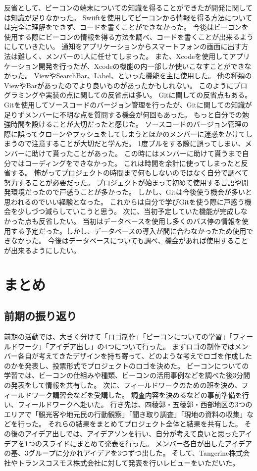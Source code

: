 \documentclass[openany,11pt,papersize]{jsbook}
\begin{document}
反省として、ビーコンの端末についての知識を得ることができたが開発に関しては知識が足りなかった。
Swiiftを使用してビーコンから情報を得る方法については完全に理解をできず、コードを書くことができなかった。
今後はビーコンを使用する際にビーコンの情報を得る方法を調べ、コードを書くことが出来るようにしていきたい。
通知をアプリケーションからスマートフォンの画面に出す方法は難しく、メンバーの1人に任せてしまった。
また、Xcodeを使用してアプリケーション開発を行ったが、Xcodeの機能の内一部しか使いこなすことができなかった。
ViewやSearchBar、Label、といった機能を主に使用した。
他の種類のViewやBarがあったのでより良いものがあったかもしれない。
このようにプログラミングや実装の点に関しての反省点は多い。
Gitに関しての反省点もある。
Gitを使用してソースコードのバージョン管理を行ったが、Gitに関しての知識が足りずメンバーに不明な点を質問する機会が何回もあった。
もっと自分での勉強時間を設けることが大切だったと感じた。
ソースコードのバージョン管理の際に誤ってクローンやプッシュをしてしまうとほかのメンバーに迷惑をかけてしまうので注意することが大切だと学んだ。
1度プルをする際に誤ってしまい、メンバーに助けて貰ったことがあった。
この時にはメンバーに助けて貰うまで自分ではコーディングをできなかった。
これは時間を余計に使ってしまったと反省する。
怖がってプロジェクトの時間まで何もしないのではなく自分で調べて努力することが必要だった。
プロジェクトが始まって初めて使用する言語や開発環境だったので戸惑うことが多かった。
しかし、Gitは今後使う機会が多いと思われるのでいい経験となった。
これからは自分で学びGitを使う際に戸惑う機会を少しづつ減らしていこうと思う。
次に、当初予定していた機能が完成しなかった点も反省したい。
当初はデータベースを使用し多くのバス停の情報を使用する予定だった。しかし、データベースの導入が間に合わなかったため使用できなかった。
今後はデータベースについても調べ、機会があれば使用することが出来るようにしたい。


\chapter{まとめ}
\section{前期の振り返り}
前期の活動では、大きく分けて「ロゴ制作」「ビーコンについての学習」「フィールドワーク」「アイデア出し」の4つについて行った。
まずロゴの制作ではメンバー各自が考えてきたデザインを持ち寄って、どのような考えでロゴを作成したのかを発表し、投票形式でプロジェクトのロゴを決めた。
ビーコンについての学習では、ビーコンの仕組みや種類、ビーコンの活用事例などを調べた後3分間の発表をして情報を共有した。
次に、フィールドワークのための班を決め、フィールドワーク講習会などを受講した。
調査内容を決めるなどの事前準備を行い、フィールドワークへ赴いた。
行き先は、四稜郭・五稜郭・西部地区の3つのエリアで「観光客や地元民の行動観察」「聞き取り調査」「現地の資料の収集」などを行った。
それらの結果をまとめてプロジェクト全体と結果を共有した。
その後のアイデア出しでは、アイデアソンを行い、自分が考えて良いと思ったアイデアを1つのスライドにまとめて発表を行った。
メンバー各自が出したアイデアの基、3グループに分かれアイデアを3つずつ出した。
そして、Tangerine株式会社やトランスコスモス株式会社に対して発表を行いレビューをいただいた。
\end{document}
